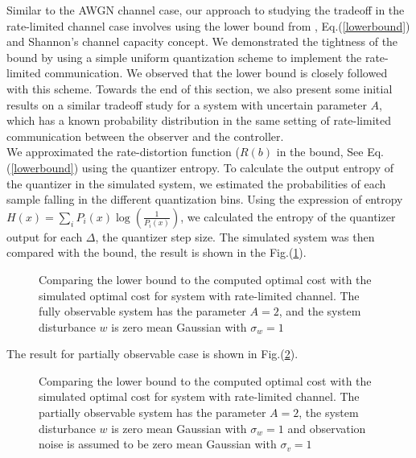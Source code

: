 \documentclass[12pt]{caltech_thesis_finalreport}
\begin{document}
		Similar to the AWGN channel case, our approach to studying the tradeoff in the rate-limited channel case involves using the lower bound from \cite{victoria}, Eq.(\ref{lowerbound}) and Shannon's channel capacity concept. We demonstrated the tightness of the bound by using a simple uniform quantization scheme to implement the rate-limited communication. We observed that the lower bound is closely followed with this scheme. Towards the end of this section, we also present some initial results on a similar tradeoff study for a system with uncertain parameter $A$, which has a known probability distribution in the same setting of rate-limited communication between the observer and the controller. 
		\\We approximated the rate-distortion function ($R(b)$ in the bound, See Eq.(\ref{lowerbound}) using the quantizer entropy. To calculate the output entropy of the quantizer in the simulated system, we estimated the probabilities of each sample falling in the different quantization bins. Using the expression of entropy $H(x) = \sum\limits_{i} P_{i}(x)\log\left(\frac{1}{P_{i}(x)}\right)$, we calculated the entropy of the quantizer output for each $\Delta$, the quantizer step size. The simulated system was then compared with the bound, the result is shown in the Fig.(\ref{lowerboundQ_sim}).
		\begin{figure}[H]
			  \centering
%			  
			  \tiny{
			}
			  \caption{Comparing the lower bound to the computed optimal cost with the simulated optimal cost for system with rate-limited channel. The fully observable system has the parameter $A = 2$, and the system disturbance $w$ is zero mean Gaussian with $\sigma_{w} = 1$}
			 \label{lowerboundQ_sim}
		\end{figure}	
		The result for partially observable case is shown in Fig.(\ref{lowerboundQ_sim_v}).
		\begin{figure}[H]
			  \centering
%			  
			  \tiny{
			}
			  \caption{Comparing the lower bound to the computed optimal cost with the simulated optimal cost for system with rate-limited channel. The partially observable system has the parameter $A = 2$, the system disturbance $w$ is zero mean Gaussian with $\sigma_{w} = 1$ and observation noise is assumed to be zero mean Gaussian with $\sigma_{v} = 1$}
			 \label{lowerboundQ_sim_v}
		\end{figure}	
\end{document}
